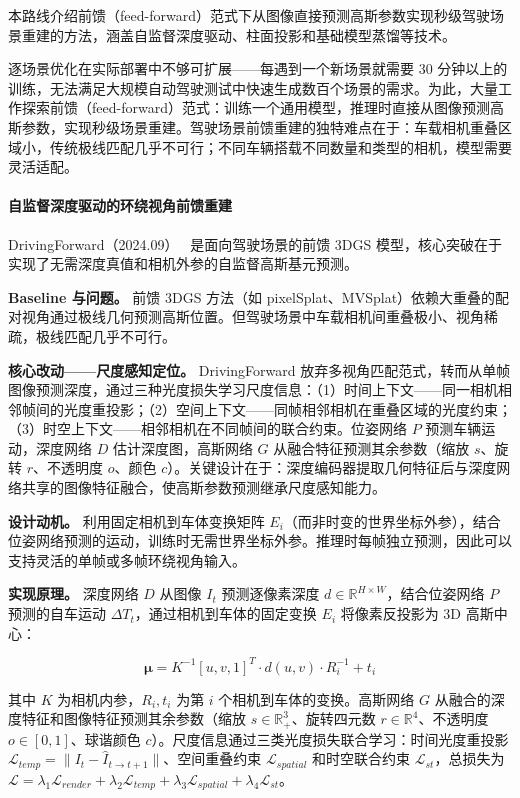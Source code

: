 本路线介绍前馈（feed-forward）范式下从图像直接预测高斯参数实现秒级驾驶场景重建的方法，涵盖自监督深度驱动、柱面投影和基础模型蒸馏等技术。

逐场景优化在实际部署中不够可扩展——每遇到一个新场景就需要 30 分钟以上的训练，无法满足大规模自动驾驶测试中快速生成数百个场景的需求。为此，大量工作探索前馈（feed-forward）范式：训练一个通用模型，推理时直接从图像预测高斯参数，实现秒级场景重建。驾驶场景前馈重建的独特难点在于：车载相机重叠区域小，传统极线匹配几乎不可行；不同车辆搭载不同数量和类型的相机，模型需要灵活适配。

\paragraph{自监督深度驱动的环绕视角前馈重建}

DrivingForward（2024.09）~\cite{2409_12753} 是面向驾驶场景的前馈 3DGS 模型，核心突破在于实现了无需深度真值和相机外参的自监督高斯基元预测。

\textbf{Baseline 与问题。} 前馈 3DGS 方法（如 pixelSplat、MVSplat）依赖大重叠的配对视角通过极线几何预测高斯位置。但驾驶场景中车载相机间重叠极小、视角稀疏，极线匹配几乎不可行。

\textbf{核心改动——尺度感知定位。} DrivingForward 放弃多视角匹配范式，转而从单帧图像预测深度，通过三种光度损失学习尺度信息：（1）时间上下文——同一相机相邻帧间的光度重投影；（2）空间上下文——同帧相邻相机在重叠区域的光度约束；（3）时空上下文——相邻相机在不同帧间的联合约束。位姿网络 $P$ 预测车辆运动，深度网络 $D$ 估计深度图，高斯网络 $G$ 从融合特征预测其余参数（缩放 $s$、旋转 $r$、不透明度 $o$、颜色 $c$）。关键设计在于：深度编码器提取几何特征后与深度网络共享的图像特征融合，使高斯参数预测继承尺度感知能力。

\textbf{设计动机。} 利用固定相机到车体变换矩阵 $E_i$（而非时变的世界坐标外参），结合位姿网络预测的运动，训练时无需世界坐标外参。推理时每帧独立预测，因此可以支持灵活的单帧或多帧环绕视角输入。

\textbf{实现原理。} 深度网络 $D$ 从图像 $I_t$ 预测逐像素深度 $d \in \mathbb{R}^{H \times W}$，结合位姿网络 $P$ 预测的自车运动 $\Delta T_t$，通过相机到车体的固定变换 $E_i$ 将像素反投影为 3D 高斯中心：

\begin{equation*}
\boldsymbol{\mu} = K^{-1} [u, v, 1]^T \cdot d(u,v) \cdot R_i^{-1} + t_i
\end{equation*}

其中 $K$ 为相机内参，$R_i, t_i$ 为第 $i$ 个相机到车体的变换。高斯网络 $G$ 从融合的深度特征和图像特征预测其余参数（缩放 $s \in \mathbb{R}^3_+$、旋转四元数 $r \in \mathbb{R}^4$、不透明度 $o \in [0,1]$、球谐颜色 $c$）。尺度信息通过三类光度损失联合学习：时间光度重投影 $\mathcal{L}_{temp} = \|I_t - \hat{I}_{t \to t+1}\|$、空间重叠约束 $\mathcal{L}_{spatial}$ 和时空联合约束 $\mathcal{L}_{st}$，总损失为 $\mathcal{L} = \lambda_1 \mathcal{L}_{render} + \lambda_2 \mathcal{L}_{temp} + \lambda_3 \mathcal{L}_{spatial} + \lambda_4 \mathcal{L}_{st}$。

